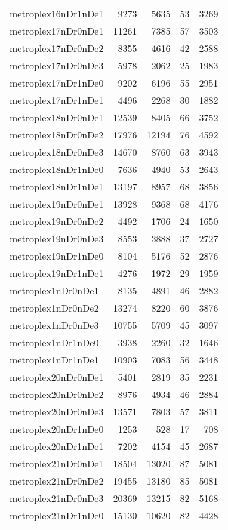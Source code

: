 \begin{tabular}{lrrrr}
metroplex16nDr1nDe1 & 9273 & 5635 & 53 & 3269 \\
metroplex17nDr0nDe1 & 11261 & 7385 & 57 & 3503 \\
metroplex17nDr0nDe2 & 8355 & 4616 & 42 & 2588 \\
metroplex17nDr0nDe3 & 5978 & 2062 & 25 & 1983 \\
metroplex17nDr1nDe0 & 9202 & 6196 & 55 & 2951 \\
metroplex17nDr1nDe1 & 4496 & 2268 & 30 & 1882 \\
metroplex18nDr0nDe1 & 12539 & 8405 & 66 & 3752 \\
metroplex18nDr0nDe2 & 17976 & 12194 & 76 & 4592 \\
metroplex18nDr0nDe3 & 14670 & 8760 & 63 & 3943 \\
metroplex18nDr1nDe0 & 7636 & 4940 & 53 & 2643 \\
metroplex18nDr1nDe1 & 13197 & 8957 & 68 & 3856 \\
metroplex19nDr0nDe1 & 13928 & 9368 & 68 & 4176 \\
metroplex19nDr0nDe2 & 4492 & 1706 & 24 & 1650 \\
metroplex19nDr0nDe3 & 8553 & 3888 & 37 & 2727 \\
metroplex19nDr1nDe0 & 8104 & 5176 & 52 & 2876 \\
metroplex19nDr1nDe1 & 4276 & 1972 & 29 & 1959 \\
metroplex1nDr0nDe1 & 8135 & 4891 & 46 & 2882 \\
metroplex1nDr0nDe2 & 13274 & 8220 & 60 & 3876 \\
metroplex1nDr0nDe3 & 10755 & 5709 & 45 & 3097 \\
metroplex1nDr1nDe0 & 3938 & 2260 & 32 & 1646 \\
metroplex1nDr1nDe1 & 10903 & 7083 & 56 & 3448 \\
metroplex20nDr0nDe1 & 5401 & 2819 & 35 & 2231 \\
metroplex20nDr0nDe2 & 8976 & 4934 & 46 & 2884 \\
metroplex20nDr0nDe3 & 13571 & 7803 & 57 & 3811 \\
metroplex20nDr1nDe0 & 1253 & 528 & 17 & 708 \\
metroplex20nDr1nDe1 & 7202 & 4154 & 45 & 2687 \\
metroplex21nDr0nDe1 & 18504 & 13020 & 87 & 5081 \\
metroplex21nDr0nDe2 & 19455 & 13180 & 85 & 5081 \\
metroplex21nDr0nDe3 & 20369 & 13215 & 82 & 5168 \\
metroplex21nDr1nDe0 & 15130 & 10620 & 82 & 4428 \\

\end{tabular}
